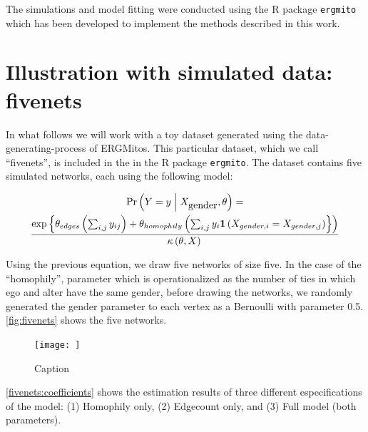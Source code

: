 \documentclass[12pt]{article}
\begin{document}
The simulations and model fitting were conducted using the R package \texttt{ergmito} which has been developed to implement the methods described in this work.

\section{Illustration with simulated data: fivenets}

In what follows we will work with a toy dataset generated using the data-generating-process of ERGMitos. This particular dataset, which we call ``fivenets'', is included in the in the R package \texttt{ergmito}. The dataset contains five simulated networks, each using the following model:

\begin{multline*}
\Prcond{\Adjmat = \adjmat}{\Indepvar_{\mbox{gender}}, \params} = \\
\frac{ %
    \exp{\params_{edges}\left(\sum_{i,j} \adjmat_{ij}\right) + %
    \params_{homophily}\left(\sum_{i,j} \adjmat_{i}\isone{\Indepvar_{gender, i} = \Indepvar_{gender, j}}}\right) %
    }{%
    \normconst{}
    }
\end{multline*}

Using the previous equation, we draw five networks of size five. In the case of the ``homophily'', parameter which is operationalized as the number of ties in which ego and alter have the same gender, before drawing the networks, we randomly generated the gender parameter to each vertex as a Bernoulli with parameter 0.5. \autoref{fig:fivenets} shows the five networks.

\begin{figure}
    \centering
    \texttt{[image: ]}
    \caption{\label{fig:fivenets}Caption}
    \label{fig:my_label}
\end{figure}


\autoref{fivenets:coefficients} shows the estimation results of three different especifications of the model: (1) Homophily only, (2) Edgecount only, and (3) Full model (both parameters).
\end{document}
